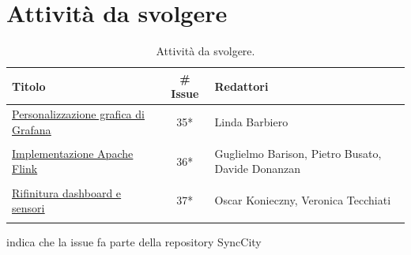 \documentclass[8pt]{article}
\begin{document}
\section{Attività da svolgere}
\begin{table}[ht!]
	\centering
	\begin{tabular}{p{7cm}cp{7cm}}
		\toprule
		\textbf{Titolo} & \textbf{\# Issue} & \textbf{Redattori} \\
		\midrule
        \href{https://github.com/NaN1fy/SyncCity/issues/35}{\underline{Personalizzazione grafica di Grafana}} & 35*\tnote{*} & Linda Barbiero \\\\
        \href{https://github.com/NaN1fy/SyncCity/issues/36}{\underline{Implementazione Apache Flink}} & 36*\tnote{*} & Guglielmo Barison, Pietro Busato, Davide Donanzan \\\\
        \href{https://github.com/NaN1fy/SyncCity/issues/37}{\underline{Rifinitura dashboard e sensori}} & 37*\tnote{*} & Oscar Konieczny, Veronica Tecchiati \\\\
		\bottomrule
	\end{tabular}
	\begin{tablenotes}
		\vspace{1em}
		\item * indica che la issue fa parte della repository SyncCity
	\end{tablenotes}
	\caption{Attività da svolgere.}
	\label{table:Attivita da svolgere}
\end{table}
\end{document}
